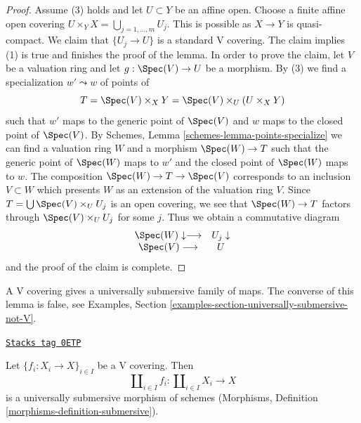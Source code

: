 \begin{proof}
\medskip\noindent
Assume (3) holds and let $U \subset Y$ be an affine open.
Choose a finite affine open covering
$U \times_Y X = \bigcup_{j = 1, \ldots, m} U_j$.
This is possible as $X \to Y$ is quasi-compact.
We claim that $\{U_j \to U\}$ is a standard V covering.
The claim implies (1) is true and finishes the proof of the lemma.
In order to prove the claim, let $V$ be a valuation ring
and let $g : \Spec(V) \to U$ be a morphism.
By (3) we find a specialization $w' \leadsto w$ of
points of
$$
T = \Spec(V) \times_X Y = \Spec(V) \times_U (U \times_X Y)
$$
such that $w'$ maps to the generic point of $\Spec(V)$
and $w$ maps to the closed point of $\Spec(V)$.
By Schemes, Lemma \ref{schemes-lemma-points-specialize}
we can find a valuation ring $W$ and a morphism
$\Spec(W) \to T$ such that the generic point of $\Spec(W)$
maps to $w'$ and the closed point of $\Spec(W)$ maps to $w$.
The composition $\Spec(W) \to T \to \Spec(V)$ corresponds
to an inclusion $V \subset W$ which presents $W$ as an
extension of the valuation ring $V$.
Since $T = \bigcup \Spec(V) \times_U U_j$ is an open
covering, we see that $\Spec(W) \to T$ factors through
$\Spec(V) \times_U U_j$ for some $j$. Thus we obtain
a commutative diagram
$$
\begin{array}{cc}\Spec(W) \downarrow\longrightarrow & U_j \downarrow \\ \Spec(V) \longrightarrow & U\end{array}
$$
and the proof of the claim is complete.
\end{proof}

A V covering gives a universally submersive family of maps.
The converse of this lemma is false, see
Examples, Section \ref{examples-section-universally-submersive-not-V}.

\begin{lemma}
\label{topologies-lemma-V-covering-universally-submersive}
\href{https://stacks.math.columbia.edu/tag/0ETP}{\texttt{Stacks tag 0ETP}}

Let $\{f_i : X_i \to X\}_{i \in I}$ be a V covering.
Then
$$
\coprod\nolimits_{i \in I} f_i :
\coprod\nolimits_{i \in I} X_i
\longrightarrow
X
$$
is a universally submersive morphism of schemes (Morphisms, Definition
\ref{morphisms-definition-submersive}).
\end{lemma}

